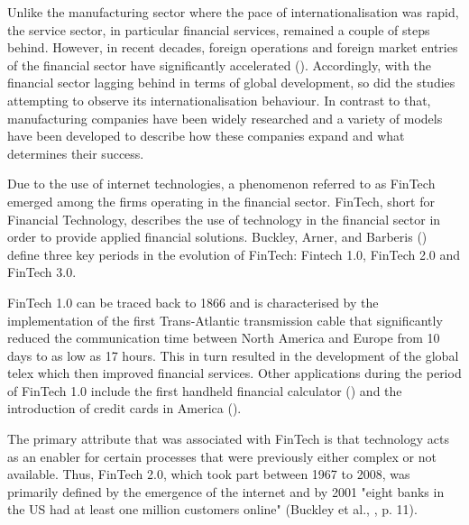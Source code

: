 \documentclass[11pt,a4paper]{article}
\begin{document}
\frenchspacing
{}\par
Unlike the manufacturing sector where the pace of internationalisation was rapid, the service sector, in particular financial services, remained a couple of steps behind. However, in recent decades, foreign operations and foreign market entries of the financial sector have significantly accelerated (\cite{hannounInternationalisationFinancialServices2006}). Accordingly, with the financial sector lagging behind in terms of global development, so did the studies attempting to observe its internationalisation behaviour. In contrast to that, manufacturing companies have been widely researched and a variety of models \parencite{dunningEclecticTheoryInternational1980, dunningEclecticParadigmEnvelope2000, johansonInternationalizationProcessFirm1977,  rennieGlobalCompetitivenessBorn1993} have been developed to describe how these companies expand and what determines their success. \par
Due to the use of internet technologies, a phenomenon referred to as FinTech emerged among the firms operating in the financial sector. FinTech, short for Financial Technology, describes the use of technology in the financial sector in order to provide applied financial solutions. Buckley, Arner, and Barberis (\citeyear{buckleyEvolutionFintechNew2016}) define three key periods in the evolution of FinTech: Fintech 1.0, FinTech 2.0 and FinTech 3.0.\par
FinTech 1.0 can be traced back to 1866 and is characterised by the implementation of the first Trans-Atlantic transmission cable that significantly reduced the communication time between North America and Europe from 10 days to as low as 17 hours. This in turn resulted in the development of the global telex which then improved financial services. Other applications during the period of FinTech 1.0 include the first handheld financial calculator (\cite{thibodeauTIFirstHandheld2007}) and the introduction of credit cards in America (\cite{markhamFinancialHistoryUnited2015}). \par
The primary attribute that was associated with FinTech is that technology acts as an enabler for certain processes that were previously either complex or not available. Thus, FinTech 2.0, which took part between 1967 to 2008, was primarily defined by the emergence of the internet and by 2001 "eight banks in the US had at least one million customers online"  (Buckley et al., \citeyear{buckleyEvolutionFintechNew2016}, p. 11). \par 
\end{document}
